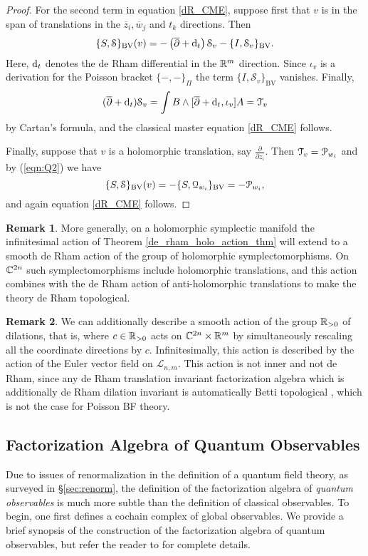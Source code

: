 \documentclass[11pt, oneside, reqno]{amsart}
\theoremstyle{definition} \newtheorem{definition}{Definition}[section]
\theoremstyle{definition}
\theoremstyle{remark}
\theoremstyle{definition} \newtheorem{remark}[definition]{Remark}
\theoremstyle{definition} \newtheorem{remarks}[definition]{Remarks}
\theoremstyle{definition} \newtheorem{question}[definition]{Question}
\theoremstyle{definition} \newtheorem*{note}{Note}
\theoremstyle{definition} \newtheorem{example}[definition]{Example}
\theoremstyle{definition} \newtheorem{examples}[definition]{Examples}
\def\Bar{\overline}
\def\cQ{\mathcal Q}\def\cR{\mathcal R}\def\cS{\mathcal S}\def\cT{\mathcal T}
\newcommand{\dbar}{\overline{\partial}}
\newcommand{\mr}[1]{\mathrm{#1}}
\newcommand{\mc}[1]{\mathcal{#1}}
\def\d{{\rm d}}
\begin{document}
\begin{proof}
For the second term in equation \ref{dR_CME}, suppose first that $v$ is in the span of translations in the $\Bar{z}_i,  \Bar{w}_j$ and $t_k$ directions. 
Then
\[
\{S, \cS\}_{\mr{BV}}(v) = - \left(\dbar + \d_{t} \right) \cS_v - \{I, \cS_v\}_{\mr{BV}} .
\] 
Here, $\d_t$ denotes the de Rham differential in the $\mathbb R^m$ direction. 
Since $\iota_v$ is a derivation for the Poisson bracket $\{-,-\}_\Pi$ the term $\{I, \cS_v\}_{\mr{BV}}$ vanishes. 
Finally,
\[
(\dbar + \d_t) \cS_v = \int B \wedge [\dbar + \d_t, \iota_v] A = \cT_v
\]
by Cartan's formula, and the classical master equation \ref{dR_CME} follows.

Finally, suppose that $v$ is a holomorphic translation, say $\frac{\partial}{\partial z_i}$.
Then $\cT_v = \cP_{w_i}$ and by (\ref{eqn:Q2}) we have 
\[
\{S, \cS\}_{\mr{BV}}(v) = - \{S, \cQ_{w_i}\}_{\mr{BV}} = - \cP_{w_i},
\]
and again equation \ref{dR_CME} follows.
\end{proof}

\begin{remark}
More generally, on a holomorphic symplectic manifold the infinitesimal action of Theorem \ref{de_rham_holo_action_thm} will extend to a smooth de Rham action of the group of holomorphic symplectomorphisms.  On $\mathbb C^{2n}$ such symplectomorphisms include holomorphic translations, and this action combines with the de Rham action of anti-holomorphic translations to make the theory de Rham topological.
\end{remark}

\begin{remark}
We can additionally describe a smooth action of the group $\mathbb R_{>0}$ of dilations, that is, where $c \in \mathbb R_{>0}$ acts on $\mathbb C^{2n} \times \mathbb R^m$ by simultaneously rescaling all the coordinate directions by $c$.  Infinitesimally, this action is described by the action of the Euler vector field on $\mc L_{n,m}$.  This action is not inner and not de Rham, since any de Rham translation invariant factorization algebra which is additionally de Rham dilation invariant is automatically Betti topological \cite[Proposition 3.38]{ElliottSafronov}, which is not the case for Poisson BF theory.
\end{remark}

\subsection{Factorization Algebra of Quantum Observables}

Due to issues of renormalization in the definition of a quantum field theory, as surveyed in \S \ref{sec:renorm}, the definition of the factorization algebra of {\em quantum observables} is much more subtle than the definition of classical observables.  To begin, one first defines a cochain complex of global observables. 
We provide a brief synopsis of the construction of the factorization algebra of quantum observables, but refer the reader to \cite{Book2} for complete details. 
\end{document}
